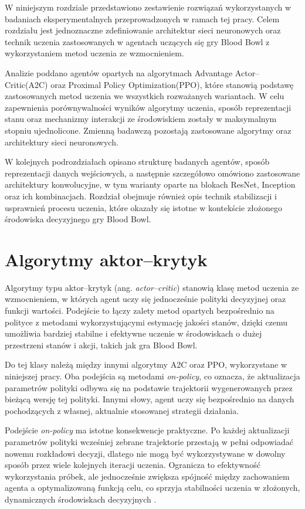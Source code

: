 W niniejszym rozdziale przedstawiono zestawienie rozwiązań wykorzystanych w badaniach
eksperymentalnych przeprowadzonych w ramach tej pracy. Celem rozdziału jest jednoznaczne
zdefiniowanie architektur sieci neuronowych oraz technik uczenia zastosowanych w agentach
uczących się gry Blood Bowl z wykorzystaniem metod uczenia ze wzmocnieniem.

Analizie poddano agentów opartych na algorytmach Advantage Actor–Critic(A2C) oraz Proximal Policy Optimization(PPO), które stanowią podstawę
zastosowanych metod uczenia we wszystkich rozważanych wariantach. W celu zapewnienia
porównywalności wyników algorytmy uczenia, sposób reprezentacji stanu oraz mechanizmy
interakcji ze środowiskiem zostały w maksymalnym stopniu ujednolicone. Zmienną badawczą
pozostają zastosowane algorytmy oraz architektury sieci neuronowych.

W kolejnych podrozdziałach opisano strukturę badanych agentów, sposób reprezentacji
danych wejściowych, a następnie szczegółowo omówiono zastosowane architektury
konwolucyjne, w tym warianty oparte na blokach ResNet, Inception oraz ich kombinacjach.
Rozdział obejmuje również opis technik stabilizacji i usprawnień procesu uczenia, które
okazały się istotne w kontekście złożonego środowiska decyzyjnego gry Blood Bowl.



\section{Algorytmy aktor--krytyk}

Algorytmy typu aktor--krytyk (ang. \textit{actor--critic}) stanowią klasę metod uczenia
ze wzmocnieniem, w których agent uczy się jednocześnie polityki decyzyjnej oraz funkcji
wartości. Podejście to łączy zalety metod opartych bezpośrednio na polityce z metodami
wykorzystującymi estymację jakości stanów, dzięki czemu umożliwia bardziej stabilne
i efektywne uczenie w środowiskach o dużej przestrzeni stanów i akcji, takich jak gra Blood Bowl.

Do tej klasy należą między innymi algorytmy A2C  oraz PPO, wykorzystane w niniejszej pracy.
Oba podejścia są metodami \textit{on-policy}, co oznacza, że aktualizacja parametrów polityki
odbywa się na podstawie trajektorii wygenerowanych przez bieżącą wersję tej polityki.
Innymi słowy, agent uczy się bezpośrednio na danych pochodzących z własnej, aktualnie
stosowanej strategii działania.

Podejście \textit{on-policy} ma istotne konsekwencje praktyczne. Po każdej aktualizacji
parametrów polityki wcześniej zebrane trajektorie przestają w pełni odpowiadać nowemu
rozkładowi decyzji, dlatego nie mogą być wykorzystywane w dowolny sposób przez wiele
kolejnych iteracji uczenia. Ogranicza to efektywność wykorzystania próbek, ale jednocześnie
zwiększa spójność między zachowaniem agenta a optymalizowaną funkcją celu, co sprzyja
stabilności uczenia w złożonych, dynamicznych środowiskach decyzyjnych
\cite{SuttonBarto2018,mnih2016}.


